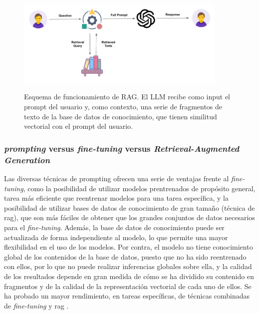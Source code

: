 \begin{figure}[H]
    \caption[Esquema de funcionamiento de RAG]{Esquema de funcionamiento de RAG. El LLM recibe como input el {prompt} del usuario y, como contexto, una serie de fragmentos de texto de la base de datos de conocimiento, que tienen similitud vectorial con el {prompt} del usuario.}
    \centering
    \includegraphics[width=0.9\textwidth]{./figuras/rag.png}
    \label{fig:rag}
\end{figure}


\subsubsection{\emph{prompting} versus \emph{fine-tuning} versus \emph{Retrieval-Augmented Generation}}

Las diversas técnicas de {prompting} ofrecen una serie de ventajas frente al \emph{fine-tuning}, como la posibilidad de utilizar modelos prentrenados de propósito general, tarea más eficiente que reentrenar modelos para una tarea específica, y la posibilidad de utilizar bases de datos de conocimiento de gran tamaño (técnica de \gls{rag}), que son más fáciles de obtener que los grandes conjuntos de datos necesarios para el \emph{fine-tuning}. Además, la base de datos de conocimiento puede ser actualizada de forma independiente al modelo, lo que permite una mayor flexibilidad en el uso de los modelos. Por contra, el modelo  no tiene conocimiento global de los contenidos de la base de datos, puesto que no ha sido reentrenado con ellos, por lo que no puede realizar inferencias globales sobre ella, y la calidad de los resultados depende en gran medida de cómo se ha dividido su contenido en fragmentos y de la calidad de la representación vectorial de cada uno de ellos. Se ha probado un mayor rendimiento, en tareas específicas, de técnicas combinadas de \emph{fine-tuning} y \gls{rag} \citep{lewisRetrievalAugmentedGenerationKnowledgeIntensive2021}.




